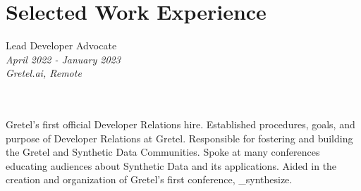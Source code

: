 \documentclass[10pt]{article} %
\begin{document}
\begin{minipage}[t]{0.5\textwidth}
\section{Selected Work Experience} 

{\raggedright\large Lead Developer Advocate\\
\small \textit{April 2022 - January 2023}\\
\small \textit{Gretel.ai, Remote}} \\ \\
\normalsize{
    Gretel's first official Developer Relations hire. Established procedures, goals, and purpose of Developer Relations at Gretel. Responsible for fostering and building the Gretel and Synthetic Data Communities. Spoke at many conferences educating audiences about Synthetic Data and its applications. Aided in the creation and organization of Gretel's first conference, \_synthesize. 
}

\end{minipage} %
\hfill
\end{document}
